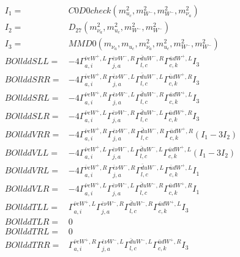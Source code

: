 \documentclass[A4,landscape]{article}
\begin{document}
\begin{align} 
I_1 = & C0D0check(m^2_{u_{{c}}}, m^2_{W^-}, m^2_{W^-}, m^2_{\nu_{{a}}}) \\ 
I_2 = & D_{27}(m^2_{\nu_{{a}}}, m^2_{u_{{c}}}, m^2_{W^-}, m^2_{W^-}) \\ 
I_3 = & MMD0(m_{\nu_{{a}}}, m_{u_{{c}}}, m^2_{\nu_{{a}}}, m^2_{u_{{c}}}, m^2_{W^-}, m^2_{W^-}) \\ 
  BOllddSLL= & -4  \Gamma^{\bar{\nu}e W^+,L}_{a, i} \Gamma^{\bar{e}\nu W^- ,R}_{j, a} \Gamma^{\bar{d}u W^- ,R}_{l, c} \Gamma^{\bar{u}d W^+,L}_{c, k} I_3 \\ 
  BOllddSRR= & -4  \Gamma^{\bar{\nu}e W^+,R}_{a, i} \Gamma^{\bar{e}\nu W^- ,L}_{j, a} \Gamma^{\bar{d}u W^- ,L}_{l, c} \Gamma^{\bar{u}d W^+,R}_{c, k} I_3 \\ 
  BOllddSRL= & -4  \Gamma^{\bar{\nu}e W^+,R}_{a, i} \Gamma^{\bar{e}\nu W^- ,L}_{j, a} \Gamma^{\bar{d}u W^- ,R}_{l, c} \Gamma^{\bar{u}d W^+,L}_{c, k} I_3 \\ 
  BOllddSLR= & -4  \Gamma^{\bar{\nu}e W^+,L}_{a, i} \Gamma^{\bar{e}\nu W^- ,R}_{j, a} \Gamma^{\bar{d}u W^- ,L}_{l, c} \Gamma^{\bar{u}d W^+,R}_{c, k} I_3 \\ 
  BOllddVRR= & -4  \Gamma^{\bar{\nu}e W^+,R}_{a, i} \Gamma^{\bar{e}\nu W^- ,R}_{j, a} \Gamma^{\bar{d}u W^- ,R}_{l, c} \Gamma^{\bar{u}d W^+,R}_{c, k} (I_1 - 3 I_2) \\ 
  BOllddVLL= & -4  \Gamma^{\bar{\nu}e W^+,L}_{a, i} \Gamma^{\bar{e}\nu W^- ,L}_{j, a} \Gamma^{\bar{d}u W^- ,L}_{l, c} \Gamma^{\bar{u}d W^+,L}_{c, k} (I_1 - 3 I_2) \\ 
  BOllddVRL= & -4  \Gamma^{\bar{\nu}e W^+,R}_{a, i} \Gamma^{\bar{e}\nu W^- ,R}_{j, a} \Gamma^{\bar{d}u W^- ,L}_{l, c} \Gamma^{\bar{u}d W^+,L}_{c, k} I_1 \\ 
  BOllddVLR= & -4  \Gamma^{\bar{\nu}e W^+,L}_{a, i} \Gamma^{\bar{e}\nu W^- ,L}_{j, a} \Gamma^{\bar{d}u W^- ,R}_{l, c} \Gamma^{\bar{u}d W^+,R}_{c, k} I_1 \\ 
  BOllddTLL= &  \Gamma^{\bar{\nu}e W^+,L}_{a, i} \Gamma^{\bar{e}\nu W^- ,R}_{j, a} \Gamma^{\bar{d}u W^- ,R}_{l, c} \Gamma^{\bar{u}d W^+,L}_{c, k} I_3 \\ 
  BOllddTLR= & 0 \\ 
  BOllddTRL= & 0 \\ 
  BOllddTRR= &  \Gamma^{\bar{\nu}e W^+,R}_{a, i} \Gamma^{\bar{e}\nu W^- ,L}_{j, a} \Gamma^{\bar{d}u W^- ,L}_{l, c} \Gamma^{\bar{u}d W^+,R}_{c, k} I_3 \\ 
\end{align} 
\end{document}

